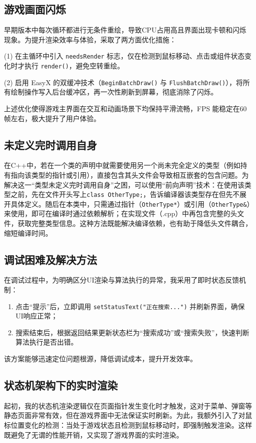 \documentclass[12pt, a4paper]{article}
\begin{document}
\subsection{游戏画面闪烁}
早期版本中每次循环都进行无条件重绘，导致CPU占用高且界面出现卡顿和闪烁现象。为提升渲染效率与体验，采取了两方面优化措施：

(1) 在主循环中引入 \texttt{needsRender} 标志，仅在检测到鼠标移动、点击或组件状态变化时才执行 \texttt{render()}，避免空转重绘。

(2) 启用 EasyX 的双缓冲技术（\texttt{BeginBatchDraw()} 与 \texttt{FlushBatchDraw()}），将所有绘制操作写入后台缓冲区，再一次性刷新到屏幕，彻底消除了闪烁。

上述优化使得游戏主界面在交互和动画场景下均保持平滑流畅，FPS 能稳定在60帧左右，极大提升了用户体验。

\subsection{未定义完时调用自身}
在C++中，若在一个类的声明中就需要使用另一个尚未完全定义的类型（例如持有指向该类型的指针或引用），直接包含其头文件会导致相互嵌套的包含问题。为解决这一“类型未定义完时调用自身”之困，可以使用“前向声明”技术：在使用该类型之前，先在文件开头写上\verb|class OtherType;|，告诉编译器该类型存在但先不展开具体定义。随后在本类中，只需通过指针（\verb|OtherType*|）或引用（\verb|OtherType&|）来使用，即可在编译时通过依赖解析；在实现文件（.cpp）中再包含完整的头文件，获取完整类型信息。这种方法既能解决编译依赖，也有助于降低头文件耦合，缩短编译时间。

\subsection{调试困难及解决方法}
在调试过程中，为明确区分UI渲染与算法执行的异常，我采用了即时状态反馈机制：
\begin{enumerate}
  \item 点击“提示”后，立即调用 \texttt{setStatusText("正在搜索...")} 并刷新界面，确保UI响应正常；
  \item 搜索结束后，根据返回结果更新状态栏为“搜索成功”或“搜索失败”，快速判断算法执行是否出错。
\end{enumerate}
该方案能够迅速定位问题根源，降低调试成本，提升开发效率。

\subsection{状态机架构下的实时渲染}
起初，我的状态机渲染逻辑仅在页面指针发生变化时才触发，这对于菜单、弹窗等静态页面非常有效，但在游戏界面中无法保证实时刷新。为此，我额外引入了对鼠标位置变化的检测：当处于游戏状态且检测到鼠标移动时，即强制触发渲染。这样既避免了无谓的性能开销，又实现了游戏界面的实时渲染。
\end{document}
